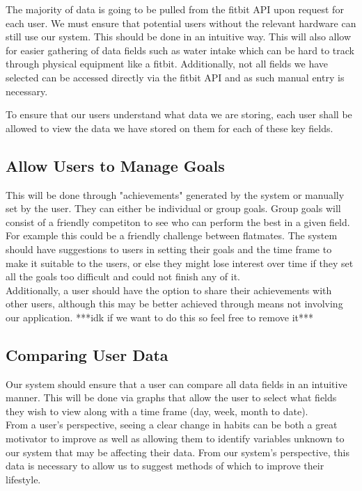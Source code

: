 \documentclass[12pt]{article}
\begin{document}
 The majority of data is going to be pulled from the fitbit API upon request for each user. We must ensure that potential users without the relevant hardware can still use our system. This should be done in an intuitive way. This will also allow for easier gathering of data fields such as water intake which can be hard to track through physical equipment like a fitbit. Additionally, not all fields we have selected can be accessed directly via the fitbit API and as such manual entry is necessary.\newline

To ensure that our users understand what data we are storing, each user shall be allowed to view the data we have stored on them for each of these key fields.\newline

\subsection{Allow Users to Manage Goals}
This will be done through "achievements" generated by the system or manually set by the user. They can either be individual or group goals. Group goals will consist of a friendly competiton to see who can perform the best in a given field. For example this could be a friendly challenge between flatmates. The system should have suggestions to users in setting their goals and the time frame to make it suitable to the users, or else they might lose interest over time if they set all the goals too difficult and could not finish any of it.\\ 

Additionally, a user should have the option to share their achievements with other users, although this may be better achieved through means not involving our application.
***idk if we want to do this so feel free to remove it***\\ 
    
\subsection{Comparing User Data}
Our system should ensure that a user can compare all data fields in an intuitive manner. This will be done via graphs that allow the user to select what fields they wish to view along with a time frame (day, week, month to date).\\

From a user's perspective, seeing a clear change in habits can be both a great motivator to improve as well as allowing them to identify variables unknown to our system that may be affecting their data. From our system's perspective, this data is necessary to allow us to suggest methods of which to improve their lifestyle.\\ 
\end{document}

